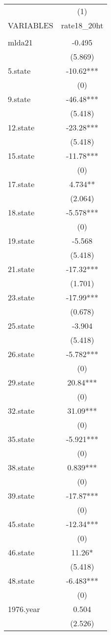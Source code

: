 \begin{tabular}{lc} \hline
 & (1) \\
VARIABLES & rate18\_20ht \\ \hline
 &  \\
mlda21 & -0.495 \\
 & (5.869) \\
5.state & -10.62*** \\
 & (0) \\
9.state & -46.48*** \\
 & (5.418) \\
12.state & -23.28*** \\
 & (5.418) \\
15.state & -11.78*** \\
 & (0) \\
17.state & 4.734** \\
 & (2.064) \\
18.state & -5.578*** \\
 & (0) \\
19.state & -5.568 \\
 & (5.418) \\
21.state & -17.32*** \\
 & (1.701) \\
23.state & -17.99*** \\
 & (0.678) \\
25.state & -3.904 \\
 & (5.418) \\
26.state & -5.782*** \\
 & (0) \\
29.state & 20.84*** \\
 & (0) \\
32.state & 31.09*** \\
 & (0) \\
35.state & -5.921*** \\
 & (0) \\
38.state & 0.839*** \\
 & (0) \\
39.state & -17.87*** \\
 & (0) \\
45.state & -12.34*** \\
 & (0) \\
46.state & 11.26* \\
 & (5.418) \\
48.state & -6.483*** \\
 & (0) \\
1976.year & 0.504 \\
 & (2.526) \\

\end{tabular}
